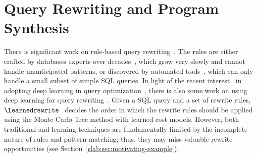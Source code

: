 \section{Query Rewriting and Program Synthesis}
\label{slab:sec:related}




There is significant work on rule-based query rewriting~\cite{dintyala2020sqlcheck,lohman1988grammar,finance1991rule,wetune,pirahesh1992extensible,chen2016memsql,begoli2018apache}. 
The rules are either crafted by databases experts over decades~\cite{begoli2018apache}, which grow very slowly and cannot handle unanticipated patterns, or discovered by automated tools~\cite{wetune}, which can only handle a small subset of simple SQL queries.
In light of the recent interest~\cite{LR} in adopting deep learning in query optimization~\cite{yang2022balsa,krishnan2018learning,marcus2019neo}, there is also some work on using deep learning for query rewriting~\cite{LR}.
Given a SQL query and a set of rewrite rules, $\learnedrewrite$~\cite{LR} decides the order in which the rewrite rules should be applied using the Monte Carlo Tree method with learned cost models. However, both traditional and learning techniques are fundamentally limited by the incomplete nature of rules and pattern-matching; thus, they may miss valuable rewrite opportunities (see Section~\ref{slab:sec:motivating-example}).

